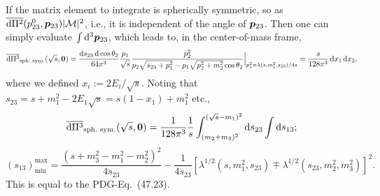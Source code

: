 \documentclass[CheatSheet]{subfiles}
\begin{document}
If the matrix element to integrate is spherically symmetric, so as $\overline{\mathop{}\!\mathrm{d}\Pi^2}(p^0_{23}, {\boldsymbol{p}}_{23})|\mathcal M|^2$, i.e., it is independent of the angle of ${\boldsymbol{p}}_{23}$. Then one can simply evaluate  $\int\mathop{}\!\mathrm{d}^3{\boldsymbol{p}}_{23}$, which leads to, in the center-of-mass frame,
\begin{equation}
\overline{\mathop{}\!\mathrm{d}\Pi^3}_{\text{sph.\ sym.}}(\sqrt{s}, {\boldsymbol{0}})
=
\frac{\mathop{}\!\mathrm{d} s_{23}\mathop{}\!\mathrm{d}\cos\theta_{2}}{64\pi^3}
\frac{p_1}{\sqrt s}
\frac{p_{2}^2}{p_2\sqrt{s_{23}+p_1^2} - p_1\sqrt{p_2^2+m_2^2}\cos\theta_2}\Big|_{
 p_1^2=\lambda(s,m_1^2,s_{23})/4s
}
= \frac{s}{128\pi^3}\mathop{}\!\mathrm{d} x_1\mathop{}\!\mathrm{d} x_2,
\end{equation}
where we defined $x_i:={2E_i}/{\sqrt s}$. Noting that $s_{23}=s+m_1^2-2E_1\sqrt{s}=s(1-x_1)+m_1^2$ etc., 
\begin{equation}
 \overline{\dd\Pi^3}_{\text{sph.\ sym.}}(\sqrt{s}, \vc 0)
=
\frac{1}{128\pi^3}\frac{1}{s}
\int_{(m_2+m_3)^2}^{(\sqrt{s}-m_1)^2}\dd s_{23}\int\dd s_{13};
\end{equation}
\begin{equation}
 (s_{13})^{\text{max}}_{\text{min}} =
\frac{(s+m_3^2-m_1^2-m_2^2)^2}{4s_{23}}
-\frac{1}{4s_{23}}
\left[\lambda^{1/2}(s,m_1^2,s_{23})\mp\lambda^{1/2}(s_{23},m_2^2,m_3^2)\right]^2.
\end{equation}
This is equal to the PDG-Eq.~(47.23)\cite{PDG2018}.


\end{document}
